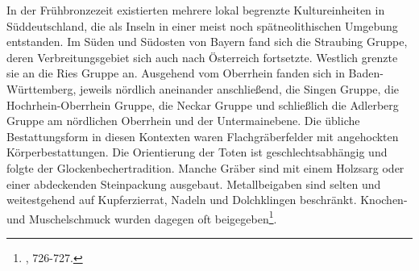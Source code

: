 \documentclass[openany,twoside,twocolumn]{book}
\let\rmarkdownfootnote\footnote%
\def\footnote{\protect\rmarkdownfootnote}
\begin{document}
In der Frühbronzezeit existierten mehrere lokal begrenzte
Kultureinheiten in Süddeutschland, die als Inseln in einer meist noch
spätneolithischen Umgebung entstanden. Im Süden und Südosten von Bayern
fand sich die Straubing Gruppe, deren Verbreitungsgebiet sich auch nach
Österreich fortsetzte. Westlich grenzte sie an die Ries Gruppe an.
Ausgehend vom Oberrhein fanden sich in Baden-Württemberg, jeweils
nördlich aneinander anschließend, die Singen Gruppe, die
Hochrhein-Oberrhein Gruppe, die Neckar Gruppe und schließlich die
Adlerberg Gruppe am nördlichen Oberrhein und der Untermainebene. Die
übliche Bestattungsform in diesen Kontexten waren Flachgräberfelder mit
angehockten Körperbestattungen. Die Orientierung der Toten ist
geschlechtsabhängig und folgte der Glockenbechertradition. Manche Gräber
sind mit einem Holzsarg oder einer abdeckenden Steinpackung ausgebaut.
Metallbeigaben sind selten und weitestgehend auf Kupferzierrat, Nadeln
und Dolchklingen beschränkt. Knochen- und Muschelschmuck wurden dagegen
oft beigegeben\footnote{\textcite{jockenhovel_germany_2013}, 726-727.}.
\end{document}
